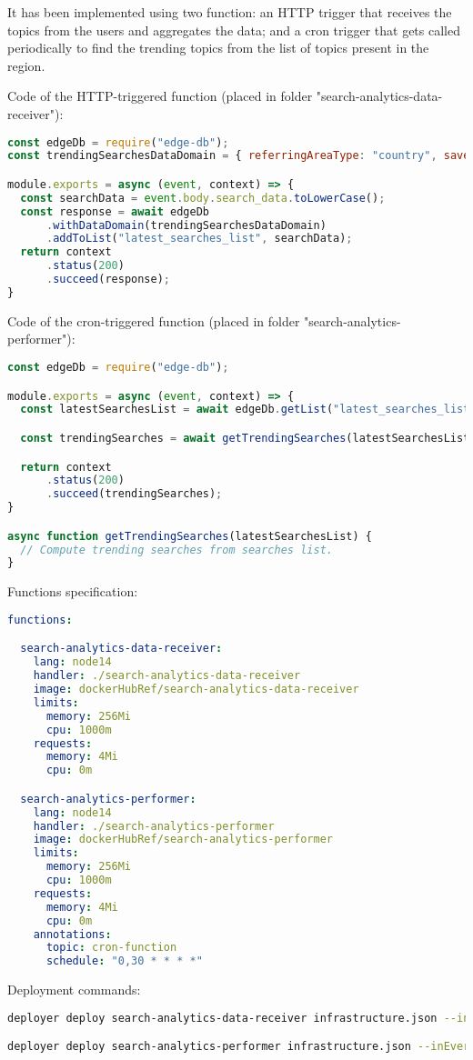 It has been implemented using two function: an HTTP trigger that receives the topics from the users and aggregates the data; and a cron trigger that gets called periodically to find the trending topics from the list of topics present in the region.

Code of the HTTP-triggered function (placed in folder "search-analytics-data-receiver"):
\begin{lstlisting}[language=javascript]
const edgeDb = require("edge-db");
const trendingSearchesDataDomain = { referringAreaType: "country", saveAlsoInIntermediateLevels: true, ttl: 4*60*60*1000  }; // 4 hours TTL.

module.exports = async (event, context) => {
  const searchData = event.body.search_data.toLowerCase();
  const response = await edgeDb
      .withDataDomain(trendingSearchesDataDomain)
      .addToList("latest_searches_list", searchData);
  return context
      .status(200)
      .succeed(response);
}
\end{lstlisting}

Code of the cron-triggered function (placed in folder "search-analytics-performer"):
\begin{lstlisting}[language=javascript]
const edgeDb = require("edge-db");

module.exports = async (event, context) => {
  const latestSearchesList = await edgeDb.getList("latest_searches_list");

  const trendingSearches = await getTrendingSearches(latestSearchesList);

  return context
      .status(200)
      .succeed(trendingSearches);
}

async function getTrendingSearches(latestSearchesList) {
  // Compute trending searches from searches list.
}
\end{lstlisting}

Functions specification:
\begin{lstlisting}[language=yaml,firstnumber=1]
functions:

  search-analytics-data-receiver:
    lang: node14
    handler: ./search-analytics-data-receiver
    image: dockerHubRef/search-analytics-data-receiver
    limits:
      memory: 256Mi
      cpu: 1000m
    requests:
      memory: 4Mi
      cpu: 0m

  search-analytics-performer:
    lang: node14
    handler: ./search-analytics-performer
    image: dockerHubRef/search-analytics-performer
    limits:
      memory: 256Mi
      cpu: 1000m
    requests:
      memory: 4Mi
      cpu: 0m
    annotations:
      topic: cron-function
      schedule: "0,30 * * * *"
\end{lstlisting}

Deployment commands:
\begin{lstlisting}[language=bash]
deployer deploy search-analytics-data-receiver infrastructure.json --inEvery city

deployer deploy search-analytics-performer infrastructure.json --inEvery territory
\end{lstlisting}
